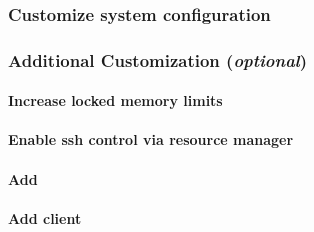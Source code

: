 \documentclass[letterpaper]{article}
\begin{document}
\subsubsection{Customize system configuration} \label{sec:master_customization}





\subsubsection{Additional Customization ({\em optional})} \label{sec:addl_customizations}


\paragraph{Increase locked memory limits}


\paragraph{Enable ssh control via resource manager} 


\paragraph{Add \beegfs{}} \label{sec:add_beegfs}


\paragraph{Add \Lustre{} client} \label{sec:lustre_client}



\end{document}
